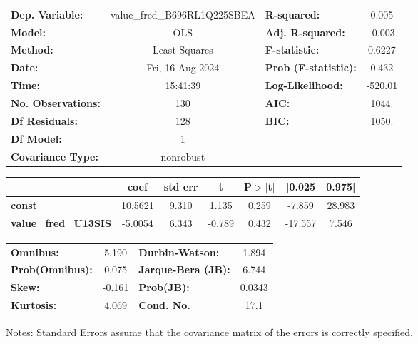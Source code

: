 \begin{center}
\begin{tabular}{lclc}
\toprule
\textbf{Dep. Variable:}      & value\_fred\_B696RL1Q225SBEA & \textbf{  R-squared:         } &     0.005   \\
\textbf{Model:}              &             OLS              & \textbf{  Adj. R-squared:    } &    -0.003   \\
\textbf{Method:}             &        Least Squares         & \textbf{  F-statistic:       } &    0.6227   \\
\textbf{Date:}               &       Fri, 16 Aug 2024       & \textbf{  Prob (F-statistic):} &    0.432    \\
\textbf{Time:}               &           15:41:39           & \textbf{  Log-Likelihood:    } &   -520.01   \\
\textbf{No. Observations:}   &               130            & \textbf{  AIC:               } &     1044.   \\
\textbf{Df Residuals:}       &               128            & \textbf{  BIC:               } &     1050.   \\
\textbf{Df Model:}           &                 1            & \textbf{                     } &             \\
\textbf{Covariance Type:}    &          nonrobust           & \textbf{                     } &             \\
\bottomrule
\end{tabular}
\begin{tabular}{lcccccc}
                             & \textbf{coef} & \textbf{std err} & \textbf{t} & \textbf{P$> |$t$|$} & \textbf{[0.025} & \textbf{0.975]}  \\
\midrule
\textbf{const}               &      10.5621  &        9.310     &     1.135  &         0.259        &       -7.859    &       28.983     \\
\textbf{value\_fred\_U13SIS} &      -5.0054  &        6.343     &    -0.789  &         0.432        &      -17.557    &        7.546     \\
\bottomrule
\end{tabular}
\begin{tabular}{lclc}
\textbf{Omnibus:}       &  5.190 & \textbf{  Durbin-Watson:     } &    1.894  \\
\textbf{Prob(Omnibus):} &  0.075 & \textbf{  Jarque-Bera (JB):  } &    6.744  \\
\textbf{Skew:}          & -0.161 & \textbf{  Prob(JB):          } &   0.0343  \\
\textbf{Kurtosis:}      &  4.069 & \textbf{  Cond. No.          } &     17.1  \\
\bottomrule
\end{tabular}
\end{center}

Notes: \newline
 [1] Standard Errors assume that the covariance matrix of the errors is correctly specified.